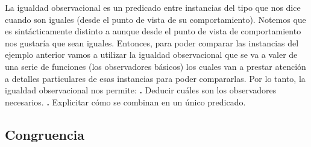 \documentclass[10pt,a4paper]{article}
\begin{document}
La igualdad observacional es un predicado entre instancias del tipo que nos dice cuando son iguales (desde el punto de vista de su comportamiento).
\newline
\newline
Notemos que  es sintácticamente distinto a  aunque desde el punto de vista de comportamiento nos gustaría que sean iguales. 
\newline
\newline
Entonces, para poder comparar las instancias del ejemplo anterior vamos a utilizar la igualdad observacional que se va a valer de una serie de funciones (los observadores básicos) los cuales van a prestar atención a detalles particulares de esas instancias para poder compararlas.
\newline
\newline
Por lo tanto, la igualdad observacional nos permite:
\newline
\newline
\textbf{.} Deducir cuáles son los observadores necesarios.
\newline
\newline
\textbf{.} Explicitar cómo se combinan en un único predicado.

\subsection{Congruencia}
\end{document}

